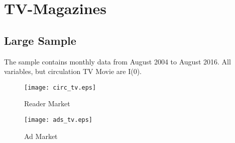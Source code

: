 \documentclass[10pt,a4paper]{scrreprt}
\begin{document}
\chapter{TV-Magazines}

\section{Large Sample} 

The sample contains monthly data from August 2004 to August 2016. All variables, but circulation TV Movie are I(0). 

\begin{figure}[H]
	\centering
	\texttt{[image: circ\_tv.eps]}
	\caption{Reader Market}
	\label{tvcirc}
\end{figure}
\begin{figure}[H]
	\centering
	\texttt{[image: ads\_tv.eps]}
	\caption{Ad Market}
	\label{tvads}
\end{figure}
\end{document}
